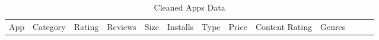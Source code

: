 \documentclass[
]{article}
\begin{document}
\begin{longtable}[]{@{}
  >{\raggedright\arraybackslash}p{}
  >{\raggedright\arraybackslash}p{}
  >{\raggedleft\arraybackslash}p{}
  >{\raggedleft\arraybackslash}p{}
  >{\raggedleft\arraybackslash}p{}
  >{\raggedleft\arraybackslash}p{}
  >{\raggedright\arraybackslash}p{}
  >{\raggedleft\arraybackslash}p{}
  >{\raggedright\arraybackslash}p{}
  >{\raggedright\arraybackslash}p{}
  >{\raggedright\arraybackslash}p{}
  >{\raggedright\arraybackslash}p{}
  >{\raggedright\arraybackslash}p{}@{}}
\caption{Cleaned Apps Data}\tabularnewline
\toprule\noalign{}
\begin{minipage}[b]{\linewidth}\raggedright
App
\end{minipage} & \begin{minipage}[b]{\linewidth}\raggedright
Category
\end{minipage} & \begin{minipage}[b]{\linewidth}\raggedleft
Rating
\end{minipage} & \begin{minipage}[b]{\linewidth}\raggedleft
Reviews
\end{minipage} & \begin{minipage}[b]{\linewidth}\raggedleft
Size
\end{minipage} & \begin{minipage}[b]{\linewidth}\raggedleft
Installs
\end{minipage} & \begin{minipage}[b]{\linewidth}\raggedright
Type
\end{minipage} & \begin{minipage}[b]{\linewidth}\raggedleft
Price
\end{minipage} & \begin{minipage}[b]{\linewidth}\raggedright
Content Rating
\end{minipage} & \begin{minipage}[b]{\linewidth}\raggedright
Genres
\end{minipage} & \begin{minipage}[b]{\linewidth}\raggedright

\end{minipage}
\end{longtable}
\end{document}
